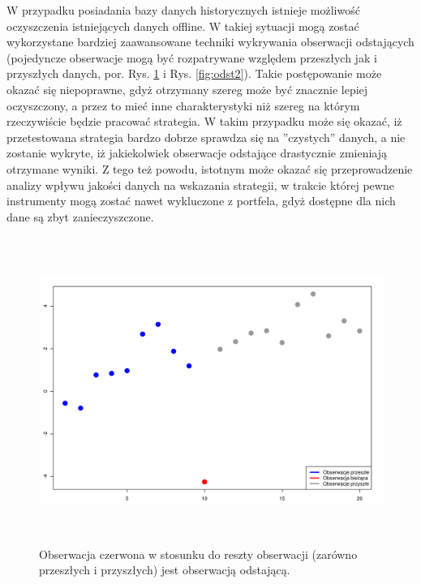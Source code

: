 \documentclass[a4paper,12pt,openany, DIV=calc, headsepline]{scrbook}
\begin{document}
W przypadku posiadania bazy danych historycznych istnieje możliwość oczyszczenia istniejących danych offline. W takiej sytuacji mogą zostać wykorzystane bardziej zaawansowane techniki wykrywania obserwacji odstających (pojedyncze obserwacje mogą być rozpatrywane względem przeszłych jak i przyszłych danych, por. Rys. \ref{fig:odst1} i Rys. \ref{fig:odst2}). Takie postępowanie może okazać się niepoprawne, gdyż otrzymany szereg może być znacznie lepiej oczyszczony, a przez to mieć inne charakterystyki niż szereg na którym rzeczywiście będzie pracować strategia. W takim przypadku może się okazać, iż przetestowana strategia bardzo dobrze sprawdza się na ''czystych'' danych, a nie zostanie wykryte, iż jakiekolwiek obserwacje odstające drastycznie zmieniają otrzymane wyniki. Z tego też powodu, istotnym może okazać się przeprowadzenie analizy wpływu jakości danych na wskazania strategii, w trakcie której pewne instrumenty mogą zostać nawet wykluczone z portfela, gdyż dostępne dla nich dane są zbyt zanieczyszczone.  


\begin{figure}[H]
  \centering
  \includegraphics[width=170mm, height=100mm]{wykresy/odst1}
  \caption{Obserwacja czerwona w stosunku do reszty obserwacji (zarówno przeszłych i przyszłych) jest obserwacją odstającą.}
  \label{fig:odst1}
\end{figure}
\end{document}
